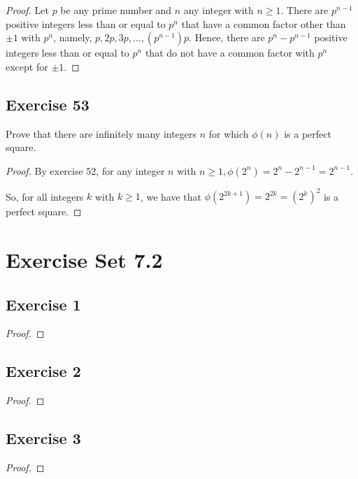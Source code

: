 \documentclass[14pt]{extarticle}
\begin{document}
\begin{proof}
Let $p$ be any prime number and $n$ any integer with \(n \geq 1\). There are \(p^{n-1}\) positive integers less than 
or equal to \(p^n\) that have a common factor other than $\pm 1$ with \(p^n\), namely, \(p, 2p, 3p, \ldots, 
(p^{n-1})p\). Hence, there are \(p^n - p^{n-1}\) positive integers less than or equal to \(p^n\) that do not have a 
common factor with \(p^n\) except for $\pm 1$.
\end{proof}

\subsection{Exercise 53}
Prove that there are infinitely many integers $n$ for which \(\phi(n)\) is a perfect square.

\begin{proof}
By exercise 52, for any integer $n$ with \(n \geq 1, \phi(2^n) = 2^n - 2^{n-1} = 2^{n-1}\).

So, for all integers $k$ with $k \geq 1$, we have that \(\phi(2^{2k+1}) = 2^{2k} = (2^k)^2\) is a perfect square.
\end{proof}

\section{Exercise Set 7.2}

\subsection{Exercise 1}

\begin{proof}

\end{proof}

\subsection{Exercise 2}

\begin{proof}

\end{proof}

\subsection{Exercise 3}

\begin{proof}

\end{proof}
\end{document}
